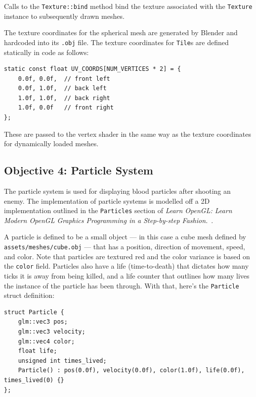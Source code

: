 \documentclass {article}
\begin{document}
Calls to the \texttt{Texture::bind} method bind the texture associated with the \texttt{Texture} instance to subsequently drawn meshes.

The texture coordinates for the spherical mesh are generated by Blender and hardcoded into its \texttt{.obj} file. The texture coordinates for \texttt{Tile}s are defined statically in code as follows:
\begin{verbatim}
static const float UV_COORDS[NUM_VERTICES * 2] = {
    0.0f, 0.0f,  // front left
    0.0f, 1.0f,  // back left
    1.0f, 1.0f,  // back right
    1.0f, 0.0f   // front right
};
\end{verbatim}

These are passed to the vertex shader in the same way as the texture coordinates for dynamically loaded meshes.

\subsection{Objective 4: Particle System}\label{sec:particles}
The particle system is used for displaying blood particles after shooting an enemy. The implementation of particle systems is modelled off a 2D implementation outlined in the \texttt{Particles} section of \textit{Learn OpenGL: Learn Modern OpenGL Graphics Programming in a Step-by-step Fashion.}~\cite{learnopengl}.

A particle is defined to be a small object --- in this case a cube mesh defined by \texttt{assets/meshes/cube.obj} --- that has a position, direction of movement, speed, and color. Note that particles are textured red and the color variance is based on the \texttt{color} field. Particles also have a life (time-to-death) that dictates how many ticks it is away from being killed, and a life counter that outlines how many lives the instance of the particle has been through. With that, here's the \texttt{Particle} struct definition:
\begin{verbatim}
struct Particle {
    glm::vec3 pos;
    glm::vec3 velocity;
    glm::vec4 color;
    float life;
    unsigned int times_lived;
    Particle() : pos(0.0f), velocity(0.0f), color(1.0f), life(0.0f), times_lived(0) {}
};
\end{verbatim}
\end{document}

